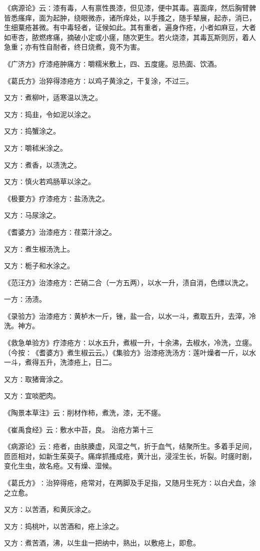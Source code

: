 \documentclass[a4paper,12pt,UTF8,twoside]{ctexbook}
\begin{document}
《病源论》云∶漆有毒，人有禀性畏漆，但见漆，便中其毒。喜面痒，然后胸臂髀皆悉瘙痒，面为起肿，绕眼微赤，诸所痒处，以手搔之，随手辇展，起赤，消已，生细粟疮甚微。有中毒轻者，证候如此。其有重者，遍身作疮，小者如麻豆，大者如枣杏，脓燃疼痛，摘破小定或小瘥，随次更生。若火烧漆，其毒瓦斯则厉，着人急重；亦有性自耐者，终日烧煮，竟不为害。

《广济方》疗漆疮肿痛方∶嚼糯米敷上，四、五度瘥。忌热面、饮酒。

《葛氏方》治猝得漆疮方∶以鸡子黄涂之，干复涂，不过三。

又方∶煮柳叶，适寒温以洗之。

又方∶捣韭，令如泥以涂之。

又方∶捣蟹涂之。

又方∶嚼秫米涂之。

又方∶煮香，以渍洗之。

又方∶慎火若鸡肠草以涂之。

《极要方》疗漆疮方∶盐汤洗之。

又方∶马尿涂之。

《耆婆方》治漆疮方∶荏菜汁涂之。

又方∶煮生椒汤洗上。

又方∶栀子和水涂之。

《范汪方》治漆疮方∶芒硝二合（一方五两），以水一升，渍自消，色缥以洗之。

一方∶汤渍。

《录验方》治漆疮方∶黄栌木一斤，锉，盐一合，以水一斗，煮取五升，去滓，冷洗。神方。

《救急单验方》疗漆疮方∶以水五升，煮椒一升，十余沸，去椒水，冷洗，立瘥。（今按∶《耆婆方》煮生椒云云。）《集验方》治漆疮洗汤方∶莲叶燥者一斤，以水一斗，煮得五升，洗漆疮上，日二。

又方∶取猪膏涂之。

又方∶宜啖肥肉。

《陶景本草注》云∶削材作柿，煮洗，漆，无不瘥。

《崔禹食经》云∶敷水中苔，良。
治疮方第十三

《病源论》云∶疮者，由肤腠虚，风湿之气，折于血气，结聚所生。多着手足间，匝匝相对，如新生茱萸子。痛痒抓搔成疮，黄汁出，浸淫生长，圻裂。时瘥时剧，变化生虫，故名疮。又有燥、湿候。

《葛氏方》∶治猝得疮，疮常对，在两脚及手足指，又随月生死方∶以白犬血，涂之立愈。

又方∶以苦酒，和黄灰涂之。

又方∶捣桃叶，以苦酒和，疮上涂之。

又方∶煮苦酒，沸，以生韭一把纳中，熟出，以敷疮上，即愈。
\end{document}
